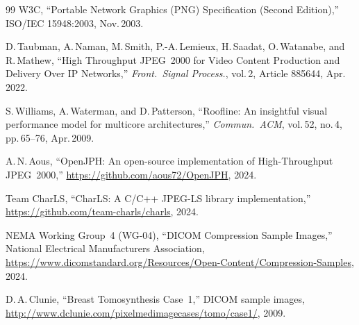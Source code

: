 \documentclass[journal]{IEEEtran}
\begin{document}
\begin{thebibliography}{99}
W3C, ``Portable Network Graphics (PNG) Specification (Second Edition),''
ISO/IEC 15948:2003, Nov.\,2003.

D.\,Taubman, A.\,Naman, M.\,Smith, P.-A.\,Lemieux, H.\,Saadat, O.\,Watanabe,
and R.\,Mathew,
``High Throughput JPEG~2000 for Video Content Production and Delivery Over IP
Networks,''
\textit{Front.\ Signal Process.}, vol.\,2, Article 885644, Apr.\,2022.

S.\,Williams, A.\,Waterman, and D.\,Patterson,
``Roofline: An insightful visual performance model for multicore
architectures,''
\textit{Commun.\ ACM}, vol.\,52, no.\,4, pp.\,65--76, Apr.\,2009.

A.\,N.\,Aous,
``OpenJPH: An open-source implementation of High-Throughput JPEG~2000,''
\url{https://github.com/aous72/OpenJPH}, 2024.

Team CharLS,
``CharLS: A C/C++ JPEG-LS library implementation,''
\url{https://github.com/team-charls/charls}, 2024.

NEMA Working Group~4 (WG-04),
``DICOM Compression Sample Images,''
National Electrical Manufacturers Association,
\url{https://www.dicomstandard.org/Resources/Open-Content/Compression-Samples},
2024.

D.\,A.\,Clunie,
``Breast Tomosynthesis Case~1,'' DICOM sample images,
\url{http://www.dclunie.com/pixelmedimagecases/tomo/case1/}, 2009.

\end{thebibliography}
\end{document}

